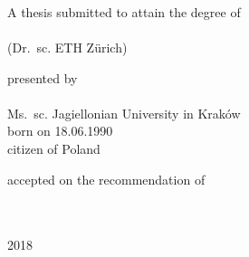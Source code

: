 
\begin{titlepage}

\begin{addmargin}[-1cm]{-3cm}
\begin{center}
\large

\hfill
\vfill


\vfill

\begingroup
\color{Maroon}
\\
\smallskip
{}\\
\smallskip
{} \\
\bigskip %
\endgroup

\vfill

A thesis submitted to attain the degree of \\
\bigskip
{} \\
\smallskip
{\small (Dr.\ sc. ETH Zürich)}

\vfill

presented by \\
\bigskip
\spacedallcaps{\myName} \\
\bigskip
{\small Ms.\ sc. Jagiellonian University in Kraków \\
\smallskip
born on 18.06.1990 \\
\smallskip
citizen of Poland}

\vfill

accepted on the recommendation of \\
\bigskip
{} \\
\smallskip
{} \\
\smallskip
{}

\vfill

2018

\vfill

\end{center}
\end{addmargin}

\end{titlepage}
